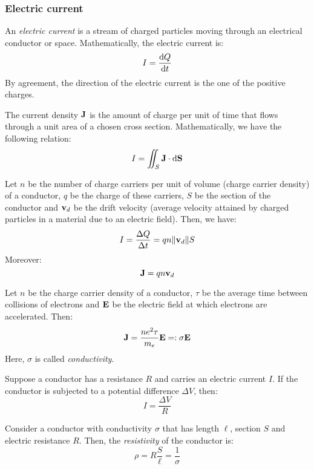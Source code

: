 \documentclass[../../../main.tex]{subfiles}
\begin{document}
\begin{multicols}{2}
    \subsubsection*{Electric current}
    \begin{definition}
        An \textit{electric current} is a stream of charged particles moving through an electrical conductor or space. Mathematically, the electric current is: $$I=\dv{Q}{t}$$
        By agreement, the direction of the electric current is the one of the positive charges.
    \end{definition}
    \begin{definition}
        The current density $\boldsymbol{\mathrm{J}}$ is the amount of charge per unit of time that flows through a unit area of a chosen cross section. Mathematically, we have the following relation: $$I=\iint_S\boldsymbol{\mathrm{J}}\cdot\dd \boldsymbol{\mathrm{S}}$$
    \end{definition}
    \begin{prop}
        Let $n$ be the number of charge carriers per unit of volume (charge carrier density) of a conductor, $q$ be the charge of these carriers, $S$ be the section of the conductor and $\boldsymbol{\mathrm{v}}_d$ be the drift velocity (average velocity attained by charged particles in a material due to an electric field). Then, we have:
        $$I=\frac{\Delta Q}{\Delta t}=q n \|\boldsymbol{\mathrm{v}}_d\|S$$
        Moreover: $$\boldsymbol{\mathrm{J}}=q n\boldsymbol{\mathrm{v}}_d$$
    \end{prop}
    \begin{law}
        Let $n$ be the charge carrier density of a conductor, $\tau$ be the average time between collisions of electrons and $\boldsymbol{\mathrm{E}}$ be the electric field at which electrons are accelerated. Then: $$\boldsymbol{\mathrm{J}}=\frac{ne^2\tau}{m_e}\boldsymbol{\mathrm{E}}=:\sigma\boldsymbol{\mathrm{E}}$$
        Here, $\sigma$ is called \textit{conductivity}.
    \end{law}
    \begin{law}
        Suppose a conductor has a resistance $R$ and carries an electric current $I$. If the conductor is subjected to a potential difference $\Delta V$, then: $$I=\frac{\Delta V}{R}$$
    \end{law}
    \begin{definition}[Resistivity]
        Consider a conductor with conductivity $\sigma$ that has length $\ell$, section $S$ and electric resistance $R$. Then, the \textit{resistivity} of the conductor is: $$\rho=R\frac{S}{\ell}=\frac{1}{\sigma}$$

\end{definition}
\end{multicols}
\end{document}
